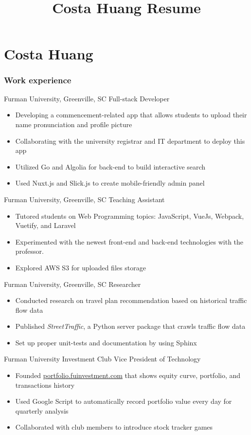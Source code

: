 \documentclass{tccv}
\title{Costa Huang Resume}
\begin{document}
\part{Costa Huang}

\section{Work experience}

\begin{eventlist}

     {Furman University, Greenville, SC}
     {Full-stack Developer}
\begin{itemize}
    \item Developing a commencement-related app that allows students to 
upload their name pronunciation and profile picture
    \item Collaborating with the university registrar and IT department to deploy this app
    \item Utilized Go and Algolia for back-end to build interactive
search
    \item Used Nuxt.js and Slick.js to create mobile-friendly admin panel
\end{itemize}

     {Furman University, Greenville, SC}
     {Teaching Assistant}
\begin{itemize}
    \item Tutored students on Web Programming topics: JavaScript, VueJs,
Webpack, Vuetify, and Laravel
    \item Experimented with the newest front-end and back-end
technologies with the professor.
    \item Explored AWS S3 for uploaded files storage
\end{itemize}

     {Furman University, Greenville, SC}
     {Researcher}
\begin{itemize}
    \item Conducted research on travel plan recommendation based on
historical traffic flow data
    \item Published \textit{StreetTraffic}, a Python server package that crawls traffic flow data 
    \item Set up proper unit-tests and documentation by using Sphinx
\end{itemize}

     {Furman University Investment Club}
     {Vice President of Technology}
\begin{itemize}
    \item Founded \href{http://portfolio.fuinvestment.com/}{portfolio.fuinvestment.com} that shows equity
curve, portfolio, and transactions history
    \item Used Google Script to automatically record portfolio value every
day for quarterly analysis
    \item Collaborated with club members to introduce stock tracker games
\end{itemize}


\end{eventlist}
\end{document}
